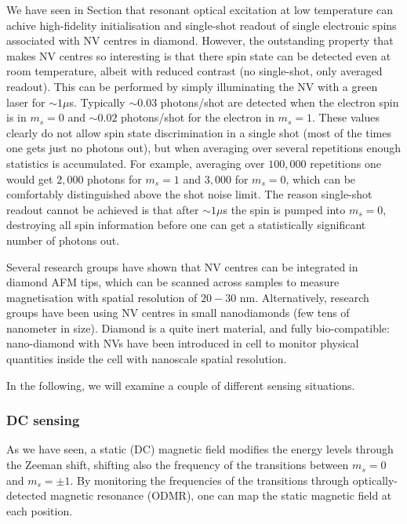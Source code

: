 \documentclass[a4paper,11pt]{article}
\begin{document}
We have seen in Section that resonant optical excitation at low temperature can achive high-fidelity initialisation and single-shot readout of single electronic spins associated with NV centres in diamond. However, the outstanding property that makes NV centres so interesting is that there spin state can be detected even at room temperature, albeit with reduced contrast (no single-shot, only averaged readout). This can be performed by simply illuminating the NV with a green laser for $\sim 1 \mu$s. Typically $\sim 0.03$ photons/shot are detected when the electron spin is in $m_s=0$ and $\sim 0.02$ photons/shot for the electron in $m_s=1$. These values clearly do not allow spin state discrimination in a single shot (most of the times one gets just no photons out), but when averaging over several repetitions enough statistics is accumulated. For example, averaging over $100,000$ repetitions one would get $2,000$ photons for $m_s=1$ and $3,000$ for $m_s=0$, which can be comfortably distinguished above the shot noise limit.
\newline The reason single-shot readout cannot be achieved is that after $\sim 1\mu$s the spin is pumped into $m_s=0$, destroying all spin information before one can get a statistically significant number of photons out.

Several research groups have shown that NV centres can be integrated in diamond AFM tips, which can be scanned across samples to measure magnetisation with spatial resolution of $20-30$ nm.
\newline Alternatively, research groups have been using NV centres in small nanodiamonds (few tens of nanometer in size). Diamond is a quite inert material, and fully bio-compatible: nano-diamond with NVs have been introduced in cell to monitor physical quantities inside the cell with nanoscale spatial resolution.

In the following, we will examine a couple of different sensing situations.

\subsubsection{DC sensing}
As we have seen, a static (DC) magnetic field modifies the energy levels through the Zeeman shift, shifting also the frequency of the transitions between $m_s = 0$ and $m_s = \pm 1$. By monitoring the frequencies of the transitions through optically-detected magnetic resonance (ODMR), one can map the static magnetic field at each position.
\end{document}

